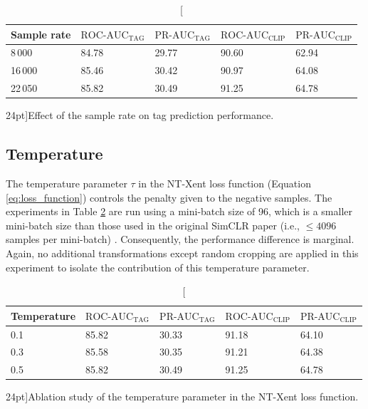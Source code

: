 \begin{table}
    \centering
        \begin{tabular}{lllll}\toprule
        Sample rate & $\text{ROC-AUC}_{\text{TAG}}$ & $\text{PR-AUC}_{\text{TAG}}$ & $\text{ROC-AUC}_{\text{CLIP}}$ & $\text{PR-AUC}_{\text{CLIP}}$ \\\midrule
        8\,000 & 84.78 & 29.77 & 90.60 & 62.94 \\
        16\,000 & 85.46 & 30.42 & 90.97 & 64.08 \\
        22\,050 & 85.82 & 30.49 & 91.25 & 64.78 \\                       
        \bottomrule
        \end{tabular}
    \caption[][24pt]{Effect of the sample rate on tag prediction performance.}
    \label{tab:sample_rate_ablation}
\end{table}



\subsection{Temperature}
The temperature parameter $\tau$ in the NT-Xent loss function (Equation \ref{eq:loss_function}) controls the penalty given to the negative samples. The experiments in Table \ref{tab:temperature_ablation} are run using a mini-batch size of 96, which is a smaller mini-batch size than those used in the original SimCLR paper (i.e., $\leq 4096$ samples per mini-batch) \cite{chen_simple_2020}. Consequently, the performance difference is marginal. Again, no additional transformations except random cropping are applied in this experiment to isolate the contribution of this temperature parameter.

\begin{table}
    \centering
    \begin{tabular}{lllll}\toprule
    Temperature & $\text{ROC-AUC}_{\text{TAG}}$ & $\text{PR-AUC}_{\text{TAG}}$ & $\text{ROC-AUC}_{\text{CLIP}}$ & $\text{PR-AUC}_{\text{CLIP}}$ \\\midrule
    0.1  & 85.82  & 30.33 & 91.18 & 64.10 \\
    0.3 & 85.58 & 30.35 & 91.21  & 64.38 \\
    0.5 & 85.82 & 30.49 & 91.25 & 64.78 \\                       
    \bottomrule
    \end{tabular}
    \caption[][24pt]{Ablation study of the temperature parameter in the NT-Xent loss function.}
    \label{tab:temperature_ablation}
\end{table}


